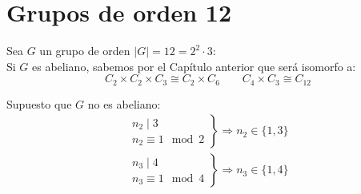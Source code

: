 \section{Grupos de orden 12}
Sea $G$ un grupo de orden $|G| = 12 = 2^2 \cdot 3$:\\

\noindent
Si $G$ es abeliano, sabemos por el Capítulo anterior que será isomorfo a:
\begin{equation*}
    C_2\times C_2\times C_3 \cong C_2\times C_6 \qquad C_4\times C_3 \cong C_{12}
\end{equation*}

\noindent
Supuesto que $G$ no es abeliano:
\begin{gather*}
    \left.\begin{array}{r}
            n_2 \mid 3 \\
            n_2 \equiv 1 \mod 2
    \end{array}\right\} \Longrightarrow n_2 \in \{1,3\} \\
    \left.\begin{array}{r}
        n_3 \mid 4 \\
        n_3 \equiv 1 \mod 4
    \end{array}\right\} \Longrightarrow n_3 \in \{1,4\}
\end{gather*}

